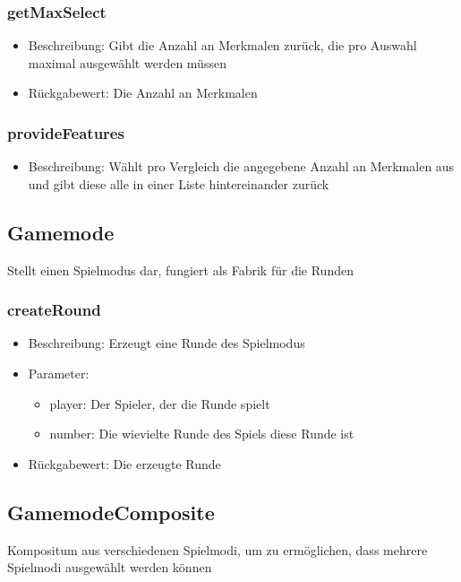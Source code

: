 \documentclass[a4paper]{scrreprt}
\begin{document}
    \subsubsection{getMaxSelect}
    \begin{itemize}
        \item Beschreibung: Gibt die Anzahl an Merkmalen zurück, die pro Auswahl maximal ausgewählt werden müssen
        \item Rückgabewert: Die Anzahl an Merkmalen
    \end{itemize}
    \subsubsection{provideFeatures}
    \begin{itemize}
        \item Beschreibung: Wählt pro Vergleich die angegebene Anzahl an Merkmalen aus und gibt diese alle in einer Liste hintereinander zurück
    \end{itemize}

    \subsection{Gamemode}
    Stellt einen Spielmodus dar, fungiert als Fabrik für die Runden
    \subsubsection{createRound}
    \begin{itemize}
        \item Beschreibung: Erzeugt eine Runde des Spielmodus
        \item Parameter:
        \begin{itemize}
            \item player: Der Spieler, der die Runde spielt
            \item number: Die wievielte Runde des Spiels diese Runde ist
        \end{itemize}
        \item Rückgabewert: Die erzeugte Runde
    \end{itemize}

    \subsection{GamemodeComposite}
    Kompositum aus verschiedenen Spielmodi, um zu ermöglichen, dass mehrere Spielmodi ausgewählt werden können
\end{document}

